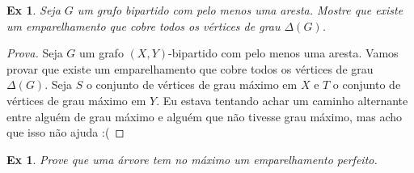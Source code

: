 \documentclass[12pt]{article}
\newcounter{exCounter}
\newtheorem{ex}[exCounter]{Ex}
\begin{document}
\begin{ex}
Seja $G$ um grafo bipartido com pelo menos uma aresta. Mostre que existe um emparelhamento que cobre todos os vértices de grau $\Delta(G)$.
\end{ex}

\begin{proof}[Prova]
Seja $G$ um grafo $(X,Y)$-bipartido com pelo menos uma aresta. Vamos provar que existe um emparelhamento que cobre todos os vértices de grau $\Delta(G)$. Seja $S$ o conjunto de vértices de grau máximo em $X$ e $T$ o conjunto de vértices de grau máximo em $Y$.
Eu estava tentando achar um caminho alternante entre alguém de grau máximo e alguém que não tivesse grau máximo, mas acho que isso não ajuda :(
\end{proof}

\begin{ex}
Prove que uma árvore tem no máximo um emparelhamento perfeito.
\end{ex}
\end{document}
